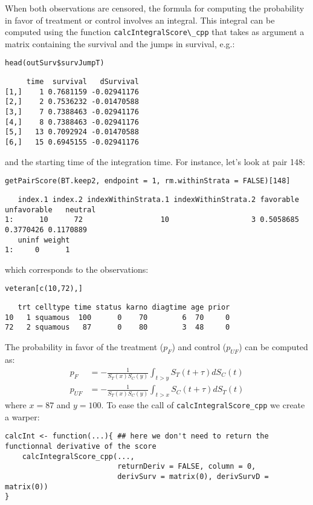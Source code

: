 \documentclass[12pt]{article}
\begin{document}
When both observations are censored, the formula for computing the
probability in favor of treatment or control involves an
integral. This integral can be computed using the function
\texttt{calcIntegralScore\textbackslash{}\_cpp} that takes as argument a matrix containing the
survival and the jumps in survival, e.g.:
\lstset{language=r,label= ,caption= ,captionpos=b,numbers=none}
\begin{lstlisting}
head(outSurv$survJumpT)
\end{lstlisting}

\begin{verbatim}
     time  survival   dSurvival
[1,]    1 0.7681159 -0.02941176
[2,]    2 0.7536232 -0.01470588
[3,]    7 0.7388463 -0.02941176
[4,]    8 0.7388463 -0.02941176
[5,]   13 0.7092924 -0.01470588
[6,]   15 0.6945155 -0.02941176
\end{verbatim}

and the starting time of the integration time. For instance, let's
look at pair 148:
\lstset{language=r,label= ,caption= ,captionpos=b,numbers=none}
\begin{lstlisting}
getPairScore(BT.keep2, endpoint = 1, rm.withinStrata = FALSE)[148]
\end{lstlisting}

\begin{verbatim}
   index.1 index.2 indexWithinStrata.1 indexWithinStrata.2 favorable unfavorable   neutral
1:      10      72                  10                   3 0.5058685   0.3770426 0.1170889
   uninf weight
1:     0      1
\end{verbatim}

which corresponds to the observations:
\lstset{language=r,label= ,caption= ,captionpos=b,numbers=none}
\begin{lstlisting}
veteran[c(10,72),]
\end{lstlisting}

\begin{verbatim}
   trt celltype time status karno diagtime age prior
10   1 squamous  100      0    70        6  70     0
72   2 squamous   87      0    80        3  48     0
\end{verbatim}

The probability in favor of the treatment (\(p_F\)) and control (\(p_{UF}\)) can be computed
as:
\begin{align*}
p_F &= -\frac{1}{S_T(x)S_C(y)}\int_{t>y} S_T(t+\tau) dS_C(t) \\
p_{UF} &= -\frac{1}{S_T(x)S_C(y)}\int_{t>x} S_C(t+\tau) dS_T(t)
\end{align*}
where \(x=87\) and \(y=100\). To ease the call of \texttt{calcIntegralScore\_cpp} we create a warper:
\lstset{language=r,label= ,caption= ,captionpos=b,numbers=none}
\begin{lstlisting}
calcInt <- function(...){ ## here we don't need to return the functionnal derivative of the score 
	calcIntegralScore_cpp(..., 
						  returnDeriv = FALSE, column = 0,
						  derivSurv = matrix(0), derivSurvD = matrix(0))
}
\end{lstlisting}
\end{document}
